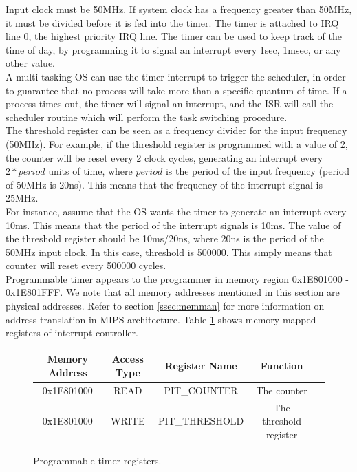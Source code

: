 \documentclass[oneside]{book}
\begin{document}
Input clock must be 50MHz. If system clock has a frequency greater than
50MHz, it must be divided before it is fed into the timer. The timer
is attached to IRQ line 0, the highest priority IRQ line. The timer
can be used to keep track of the time of day, by programming it
to signal an interrupt every 1sec, 1msec, or any other value.\\

A multi-tasking OS can use the timer interrupt to trigger the scheduler,
in order to guarantee that no process will take more than a specific
quantum of time. If a process times out, the timer will signal an
interrupt, and the ISR will call the scheduler routine which will
perform the task switching procedure.\\

The threshold register can be seen as a frequency divider for the input
frequency (50MHz). For example, if the threshold register is programmed
with a value of 2, the counter will be reset every 2 clock cycles,
generating an interrupt every $2*period$ units of time, where $period$
is the period of the input frequency (period of 50MHz is 20ns). This
means that the frequency of the interrupt signal is 25MHz.\\

For instance, assume that the OS wants the timer to generate an interrupt
every 10ms. This means that the period of the interrupt signals is 10ms.
The value of the threshold register should be 10ms/20ns, where 20ns is the
period of the 50MHz input clock. In this case, threshold is 500000. This
simply means that counter will reset every 500000 cycles.\\

Programmable timer appears to the programmer in memory region
0x1E801000 - 0x1E801FFF. We note that all memory addresses mentioned in this
section are physical addresses. Refer to section \ref{ssec:memman} for
more information on address translation in MIPS architecture. Table
\ref{pitregs} shows memory-mapped registers of interrupt controller.\\

\begin{figure}[H]
\begin{center}
\begin{tabular}{|c|c|c|c|c|}

\hline \textbf{Memory Address} & \textbf{Access Type} &
       \textbf{Register Name} & \textbf{Function}  \\

\hline 0x1E801000 & READ & PIT\_COUNTER & The counter \\
\hline 0x1E801000 & WRITE & PIT\_THRESHOLD & The threshold register \\
\hline

\end{tabular}
\end{center}
\caption{Programmable timer registers.}
\label{pitregs}
\end{figure}
\end{document}
